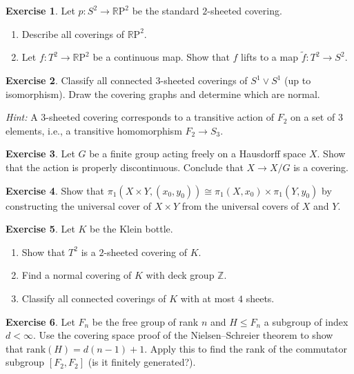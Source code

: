 \documentclass[12pt,a4paper,openany]{book}
\theoremstyle{definition}
\newtheorem{exercise}{Exercise}[chapter]
\theoremstyle{plain}
\theoremstyle{remark}
\newcommand{\Z}{\mathbb{Z}}
\newcommand{\RP}{\mathbb{R}\mathrm{P}}
\begin{document}
\begin{exercise}\label{exo:cov-RP2-lifts}
  Let $p\colon S^2 \to \RP^2$ be the standard $2$-sheeted covering.
  \begin{enumerate}[label=(\alph*)]
    \item Describe all coverings of $\RP^2$.
    \item Let $f\colon T^2 \to \RP^2$ be a continuous map.  Show that $f$
      lifts to a map $\tilde{f}\colon T^2 \to S^2$.
  \end{enumerate}
\end{exercise}

\begin{exercise}\label{exo:cov-3sheeted}
  Classify all connected $3$-sheeted coverings of $S^1 \vee S^1$ (up to
  isomorphism).  Draw the covering graphs and determine which are normal.

  \textit{Hint:} A $3$-sheeted covering corresponds to a transitive action of
  $F_2$ on a set of $3$ elements, i.e., a transitive homomorphism
  $F_2 \to S_3$.
\end{exercise}

\begin{exercise}\label{exo:cov-free-action}
  Let $G$ be a finite group acting freely on a Hausdorff space $X$.
  Show that the action is properly discontinuous.  Conclude that
  $X \to X/G$ is a covering.
\end{exercise}

\begin{exercise}\label{exo:cov-pi1-product}
  Show that $\pi_1(X \times Y, (x_0, y_0)) \cong \pi_1(X, x_0) \times
  \pi_1(Y, y_0)$ by constructing the universal cover of $X \times Y$ from
  the universal covers of $X$ and $Y$.
\end{exercise}

\begin{exercise}\label{exo:cov-klein-coverings}
  Let $K$ be the Klein bottle.
  \begin{enumerate}[label=(\alph*)]
    \item Show that $T^2$ is a $2$-sheeted covering of $K$.
    \item Find a normal covering of $K$ with deck group $\Z$.
    \item Classify all connected coverings of $K$ with at most $4$ sheets.
  \end{enumerate}
\end{exercise}

\begin{exercise}\label{exo:cov-rank-formula}
  Let $F_n$ be the free group of rank $n$ and $H \leq F_n$ a subgroup of
  index $d < \infty$.  Use the covering space proof of the Nielsen--Schreier
  theorem to show that $\mathrm{rank}(H) = d(n-1) + 1$.  Apply this to find
  the rank of the commutator subgroup $[F_2, F_2]$ (is it finitely generated?).
\end{exercise}
\end{document}
